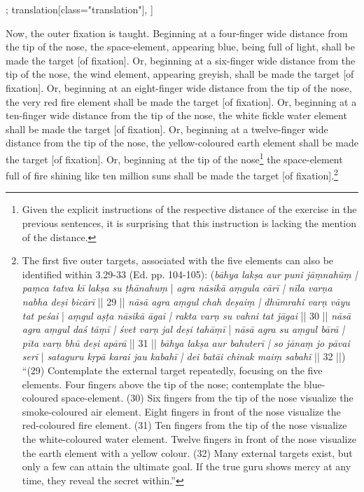 \begin{alignment}[
  texts=edition[class="edition"];
  translation[class="translation"],
  ]
\begin{translation}
\begin{tlate}[p23_01]
  Now, the outer fixation is taught. Beginning at a four-finger wide distance from the tip of the nose, the space-element, appearing blue, being full of light, shall be made the target [of fixation]. Or, beginning at a six-finger wide distance from the tip of the nose, the wind element, appearing greyish, shall be made the target [of fixation]. Or, beginning at an eight-finger wide distance from the tip of the nose, the very red fire element shall be made the target [of fixation]. Or, beginning at a ten-finger wide distance from the tip of the nose, the white fickle water element shall be made the target [of fixation]. Or, beginning at a twelve-finger wide distance from the tip of the nose, the yellow-coloured earth element shall be made the target [of fixation]. Or, beginning at the tip of the nose\footnote{Given the explicit instructions of the respective distance of the exercise in the previous sentences, it is surprising that this instruction is lacking the mention of the distance.} the space-element full of fire shining like ten million suns shall be made the target [of fixation].\footnote{The first five outer targets, associated with the five elements can also be identified within  3.29-33 (Ed. pp. 104-105): (\textit{bāhya lakṣa aur puni jāṃnahūṃ | paṃca tatva kī lakṣa su ṭhānahuṃ} | \textit{agra nāsikā aṃgula cārī | nīla varṇa nabha deṣi bicārī} || 29 || \textit{nāsā agra aṃgul chah deṣaiṃ | dhūmrahi varṇ vāyu tat peśai} | \textit{aṃgul aṣṭa nāsikā āgai | rakta varṇ su vahni tat jāgai} || 30 || \textit{nāsā agra aṃgul daś tāṃī | śvet varṇ jal deṣi tahāṃī} | \textit{nāsā agra su aṃgul bārā | pīta varṇ bhū deṣi apārā} || 31 || \textit{bāhya lakṣa aur bahuterī | so jānaṃ jo pāvai serī} | \textit{sataguru kṛpā karai jau kabahī | dei batāi chinak maiṃ sabahī} || 32 ||) ``(29) Contemplate the external target repeatedly, focusing on the five elements. Four fingers above the tip of the nose; contemplate the blue-coloured space-element. (30) Six fingers from the tip of the nose visualize the smoke-coloured air element. Eight fingers in front of the nose visualize the red-coloured fire element. (31)  Ten fingers from the tip of the nose visualize the white-coloured water element. Twelve fingers in front of the nose visualize the earth element with a yellow colour. (32) Many external targets exist, but only a few can attain the ultimate goal. If the true guru shows mercy at any time, they reveal the secret within.''}
  \flushpage 
    \end{tlate}
  \end{translation}
\end{alignment}
